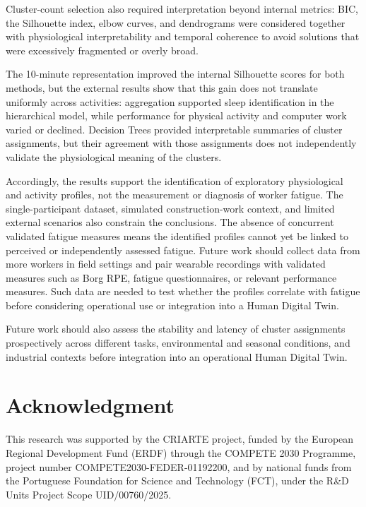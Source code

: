 \documentclass[a4paper,fleqn]{cas-sc}
\newcommand{\newtext}[1]{{\color{magenta}#1}}
\newcommand{\newtextblue}[1]{{\color{blue}#1}}
\begin{document}
Cluster-count selection also required interpretation beyond internal metrics: BIC, the Silhouette index, elbow curves, and dendrograms were considered together with physiological interpretability and temporal coherence to avoid solutions that were excessively fragmented or overly broad.

\newtextblue{The 10-minute representation improved the internal Silhouette scores for both methods, but the external results show that this gain does not translate uniformly across activities: aggregation supported sleep identification in the hierarchical model, while performance for physical activity and computer work varied or declined. Decision Trees provided interpretable summaries of cluster assignments, but their agreement with those assignments does not independently validate the physiological meaning of the clusters.}

\newtext{Accordingly, the results support the identification of exploratory physiological and activity profiles, not the measurement or diagnosis of worker fatigue.} \newtextblue{The single-participant dataset, simulated construction-work context, and limited external scenarios also constrain the conclusions.} \newtext{The absence of concurrent validated fatigue measures means the identified profiles cannot yet be linked to perceived or independently assessed fatigue. Future work should collect data from more workers in field settings and pair wearable recordings with validated measures such as Borg RPE, fatigue questionnaires, or relevant performance measures. Such data are needed to test whether the profiles correlate with fatigue before considering operational use or integration into a Human Digital Twin.}

Future work should also assess the stability and latency of cluster assignments prospectively across different tasks, environmental and seasonal conditions, and industrial contexts before integration into an operational Human Digital Twin.

\section*{Acknowledgment}

This research was supported by the CRIARTE project, funded by the European Regional Development Fund (ERDF) through the COMPETE 2030 Programme, project number COMPETE2030-FEDER-01192200, and by national funds from the Portuguese Foundation for Science and Technology (FCT), under the R\&D Units Project Scope UID/00760/2025.
\end{document}
